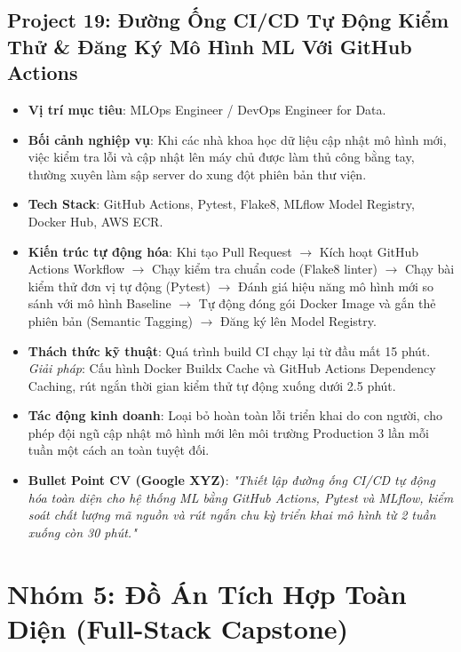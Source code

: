 \subsection{Project 19: Đường Ống CI/CD Tự Động Kiểm Thử \& Đăng Ký Mô Hình ML Với GitHub Actions}
\begin{itemize}
    \item \textbf{Vị trí mục tiêu}: MLOps Engineer / DevOps Engineer for Data.
    \item \textbf{Bối cảnh nghiệp vụ}: Khi các nhà khoa học dữ liệu cập nhật mô hình mới, việc kiểm tra lỗi và cập nhật lên máy chủ được làm thủ công bằng tay, thường xuyên làm sập server do xung đột phiên bản thư viện.
    \item \textbf{Tech Stack}: GitHub Actions, Pytest, Flake8, MLflow Model Registry, Docker Hub, AWS ECR.
    \item \textbf{Kiến trúc tự động hóa}: Khi tạo Pull Request $\rightarrow$ Kích hoạt GitHub Actions Workflow $\rightarrow$ Chạy kiểm tra chuẩn code (Flake8 linter) $\rightarrow$ Chạy bài kiểm thử đơn vị tự động (Pytest) $\rightarrow$ Đánh giá hiệu năng mô hình mới so sánh với mô hình Baseline $\rightarrow$ Tự động đóng gói Docker Image và gắn thẻ phiên bản (Semantic Tagging) $\rightarrow$ Đăng ký lên Model Registry.
    \item \textbf{Thách thức kỹ thuật}: Quá trình build CI chạy lại từ đầu mất 15 phút. \textit{Giải pháp}: Cấu hình Docker Buildx Cache và GitHub Actions Dependency Caching, rút ngắn thời gian kiểm thử tự động xuống dưới 2.5 phút.
    \item \textbf{Tác động kinh doanh}: Loại bỏ hoàn toàn lỗi triển khai do con người, cho phép đội ngũ cập nhật mô hình mới lên môi trường Production 3 lần mỗi tuần một cách an toàn tuyệt đối.
    \item \textbf{Bullet Point CV (Google XYZ)}: \textit{"Thiết lập đường ống CI/CD tự động hóa toàn diện cho hệ thống ML bằng GitHub Actions, Pytest và MLflow, kiểm soát chất lượng mã nguồn và rút ngắn chu kỳ triển khai mô hình từ 2 tuần xuống còn 30 phút."}
\end{itemize}

\section{Nhóm 5: Đồ Án Tích Hợp Toàn Diện (Full-Stack Capstone)}

